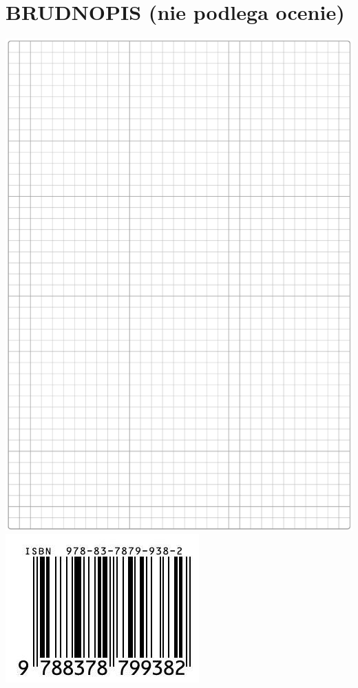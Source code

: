 \documentclass[10pt]{article}
\begin{document}
\section*{BRUDNOPIS (nie podlega ocenie)}
\includegraphics[max width=\textwidth, center]{2024_11_21_6574e892c2387ce90f12g-15}\\
\includegraphics[max width=\textwidth, center]{2024_11_21_6574e892c2387ce90f12g-16}
\end{document}
